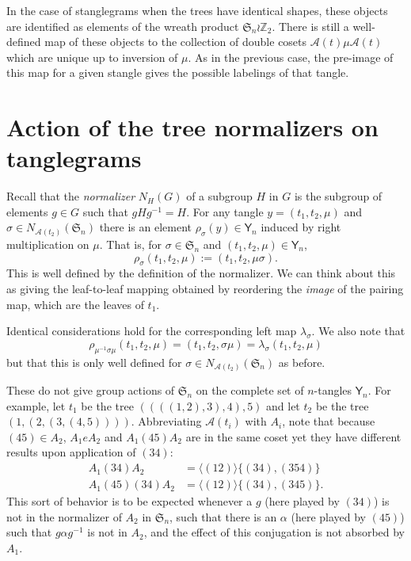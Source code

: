 \documentclass{amsart}
\newcommand{\ZZ}{\mathbb Z}
\newcommand{\fS}{\mathfrak S}
\newcommand{\aut}{\mathcal A}
\newcommand{\pairing}{\mu}
\newcommand{\tangle}{\mathsf{Y}}
\newcommand{\wrtwo}{\wr \ZZ_2}
\begin{document}
In the case of stanglegrams when the trees have identical shapes, these objects are identified as elements of the wreath product $\fS_n \wrtwo$.
There is still a well-defined map of these objects to the collection of double cosets $\aut(t) \pairing \aut(t)$ which are unique up to inversion of $\pairing$.
As in the previous case, the pre-image of this map for a given stangle gives the possible labelings of that tangle.


\section{Action of the tree normalizers on tanglegrams}
Recall that the \emph{normalizer} $N_H(G)$ of a subgroup $H$ in $G$ is the subgroup of elements $g \in G$ such that $gHg^{-1} = H$.
For any tangle $y = (t_1, t_2, \pairing)$ and $\sigma \in N_{\aut(t_2)}(\fS_n)$ there is an element $\rho_\sigma(y) \in \tangle_n$ induced by right multiplication on $\pairing$.
That is, for $\sigma \in \fS_n$ and $(t_1, t_2, \pairing) \in \tangle_n$,
\begin{equation}
\label{eq:action}
\rho_\sigma (t_1, t_2, \pairing) := (t_1, t_2, \pairing \sigma).
\end{equation}
This is well defined by the definition of the normalizer.
We can think about this as giving the leaf-to-leaf mapping obtained by reordering the \emph{image} of the pairing map, which are the leaves of $t_1$.

Identical considerations hold for the corresponding left map $\lambda_\sigma$.
We also note that
\[
\rho_{\pairing^{-1} \sigma \pairing} (t_1, t_2, \pairing) =
(t_1, t_2, \sigma \pairing) =
\lambda_{\sigma} (t_1, t_2, \pairing)
\]
but that this is only well defined for $\sigma \in N_{\aut(t_2)}(\fS_n)$ as before.

These do not give group actions of $\fS_n$ on the complete set of $n$-tangles $\tangle_n$.
For example, let $t_1$ be the tree $((((1,2),3),4),5)$ and let $t_2$ be the tree $(1,(2,(3,(4,5))))$.
Abbreviating $\aut(t_i)$ with $A_i$, note that because $(4 5) \in A_2$, $A_1 e A_2$ and $A_1 (4 5) A_2$ are in the same coset yet they have different results upon application of $(3 4)$:
\begin{align*}
A_1 (3 4) A_2 & = \langle (1 2) \rangle \{(3 4), (3 5 4)\} \\
A_1 (4 5) (3 4) A_2 & = \langle (1 2) \rangle \{(3 4), (3 4 5)\}.
\end{align*}
This sort of behavior is to be expected whenever a $g$ (here played by $(3 4)$) is not in the normalizer of $A_2$ in $\fS_n$, such that there is an $\alpha$ (here played by $(4 5)$) such that $g \alpha g^{-1}$ is not in $A_2$, and the effect of this conjugation is not absorbed by $A_1$.
\end{document}
